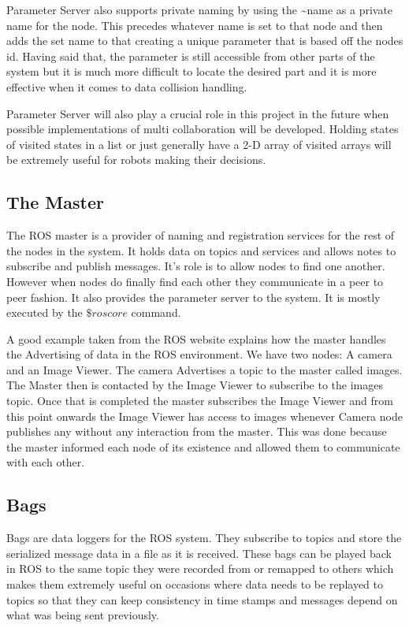 \documentclass{report}
\begin{document}
      Parameter Server also supports private naming by using the \textasciitilde name as a private name for the node. This precedes whatever name is set to that node and then adds the set name to that creating a unique parameter that is based off the nodes id. Having said that, the parameter is still accessible from other parts of the system but it is much more difficult to locate the desired part and it is more effective when it comes to data collision handling.

      Parameter Server will also play a crucial role in this project in the future when possible implementations of multi collaboration will be developed. Holding states of visited states in a list or just generally have a 2-D array of visited arrays will be extremely useful for robots making their decisions.

      \subsection{The Master}
      
      The ROS master is a provider of naming and registration services for the rest of the nodes in the system. It holds data on topics and services and allows notes to subscribe and publish messages. It's role is to allow nodes to find one another. However when nodes do finally find each other they communicate in a peer to peer fashion. It also provides the parameter server to the system. It is mostly executed by the $\$ roscore$ command.

      A good example taken from the ROS website explains how the master handles the Advertising of data in the ROS environment. We have two nodes: A camera and an Image Viewer. The camera Advertises a topic to the master called images. The Master then is contacted by the Image Viewer to subscribe to the images topic. Once that is completed the master subscribes the Image Viewer and from this point onwards the Image Viewer has access to images whenever Camera node publishes any without any interaction from the master. This was done because the master informed each node of its existence and allowed them to communicate with each other.

      \subsection{Bags}

      Bags are data loggers for the ROS system. They subscribe to topics and store the serialized message data in a file as it is received. These bags can be played back in ROS to the same topic they were recorded from or remapped to others which makes them extremely useful on occasions where data needs to be replayed to topics so that they can keep consistency in time stamps and messages depend on what was being sent previously.
\end{document}
